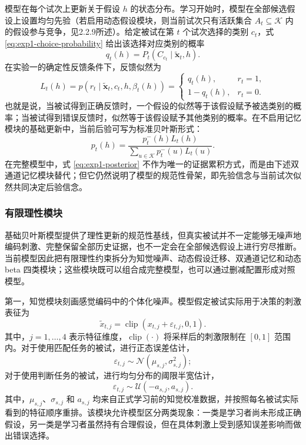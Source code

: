 模型在每个试次上更新关于假设 $h$ 的状态分布。学习开始时，模型在全部候选假设上设置均匀先验（若启用动态假设模块，则当前试次只有活跃集合 $A_t\subseteq\mathcal K$ 内的假设参与竞争，见2.2.9所述）。给定被试在第 $t$ 个试次选择的类别 $c_t$，式 \ref{eq:exp1-choice-probability} 给出该选择对应类别的概率
\begin{equation}
    q_t(h)=P_t(C_{c_t}\mid\tilde{\mathbf{x}}_t,h).
    \label{eq:exp1-choice-support}
\end{equation}
在实验一的确定性反馈条件下，反馈似然为
\begin{equation}
    L_t(h)
    =
    p(r_t\mid\tilde{\mathbf{x}}_t,c_t,h,\beta_t(h))
    =
    \begin{cases}
        q_t(h), & r_t=1,\\
        1-q_t(h), & r_t=0.
    \end{cases}
    \label{eq:exp1-likelihood}
\end{equation}
也就是说，当被试得到正确反馈时，一个假设的似然等于该假设赋予被选类别的概率；当被试得到错误反馈时，似然等于该假设赋予其他类别的概率。在不启用记忆模块的基础更新中，当前后验可写为标准贝叶斯形式：
\begin{equation}
    p_t(h)
    =
    \frac{p_t^-(h)L_t(h)}
    {\sum_{u\in\mathcal K}p_t^-(u)L_t(u)}.
    \label{eq:exp1-posterior}
\end{equation}
在完整模型中，式 \ref{eq:exp1-posterior} 不作为唯一的证据累积方式，而是由下述双通道记忆模块替代；但它仍然说明了模型的规范性骨架，即先验信念与当前试次似然共同决定后验信念。

\subsubsection{有限理性模块}

基础贝叶斯模型提供了理性更新的规范性基线，但真实被试并不一定能够无噪声地编码刺激、完整保留全部历史证据，也不一定会在全部候选假设上进行穷尽推断。当前模型因此把有限理性约束拆分为知觉噪声、动态假设迁移、双通道记忆和动态 beta 四类模块；这些模块既可以组合成完整模型，也可以通过删减配置形成对照模型。

第一，知觉模块刻画感觉编码中的个体化噪声。模型假定被试实际用于决策的刺激表征为
\begin{equation}
    \tilde{x}_{t,j}
    =
    \operatorname{clip}(x_{t,j}+\varepsilon_{t,j},0,1).
    \label{eq:exp1-perception}
\end{equation}
其中，$j=1,\ldots,4$ 表示特征维度，$\operatorname{clip}(\cdot)$ 将采样后的刺激限制在 $[0,1]$ 范围内。对于使用匹配任务的被试，进行正态误差估计，
\begin{equation}
    \varepsilon_{t,j}\sim\mathcal N(\mu_{s,j},\sigma_{s,j}^{2});
    \label{eq:exp1-perception-normal}
\end{equation}
对于使用判断任务的被试，进行均匀分布的阈限半宽估计，
\begin{equation}
    \varepsilon_{t,j}\sim\mathcal U(-a_{s,j},a_{s,j}).
    \label{eq:exp1-perception-uniform}
\end{equation}
其中，$\mu_{s,j}$、$\sigma_{s,j}$ 和 $a_{s,j}$ 均来自正式学习前的知觉校准数据，并按照每名被试实际看到的特征顺序重排。该模块允许模型区分两类现象：一类是学习者尚未形成正确假设，另一类是学习者虽然持有合理假设，但在具体刺激上受到感知误差影响而做出错误选择。

